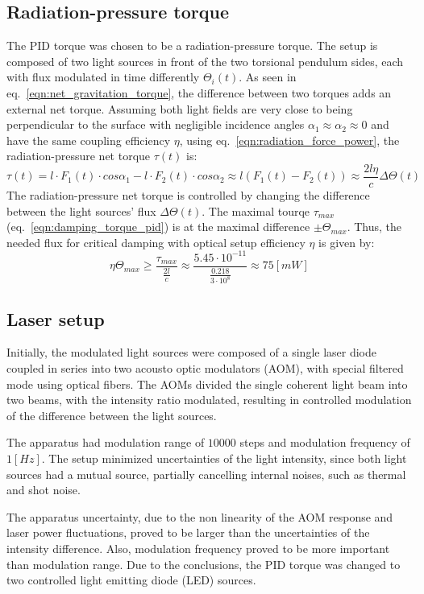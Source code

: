 \documentclass[\main/master.tex]{subfiles}
\begin{document}
\subsection{Radiation-pressure torque}
The PID torque was chosen to be a radiation-pressure torque. The setup is composed of two light sources in front of the two torsional pendulum sides, each with flux modulated in time differently $\Theta_i(t)$. As seen in eq.~\ref{eqn:net_gravitation_torque}, the difference between two torques adds an external net torque. Assuming both light fields are very close to being perpendicular to the surface with negligible incidence angles $\alpha_1\approx\alpha_2\approx 0$ and have the same coupling efficiency $\eta$, using eq.~\ref{eqn:radiation_force_power}, the radiation-pressure net torque $\tau(t)$ is:  
\begin{equation}
\tau(t) = l\cdot F_1(t) \cdot cos\alpha_1 - l\cdot F_2(t) \cdot cos\alpha_2\approx l(F_1(t) - F_2(t)) \approx \frac{2l\eta}{{c}} \Delta \Theta(t) \label{eqn:radiation torque}
\end{equation}
The radiation-pressure net torque is controlled by changing the difference between the light sources' flux $\Delta \Theta(t)$. The maximal tourqe $\tau_{max}$ (eq.~\ref{eqn:damping_torque_pid}) is at the maximal difference $\pm \Theta_{max}$. Thus, the needed flux for critical damping with optical setup efficiency $\eta$ is given by: 
\begin{equation}
\eta\Theta_{max} \geq \frac{\tau_{max}}{\frac{2 l}{c}}\approx \frac{5.45\cdot10^{-11}}{\frac{ 0.218}{3\cdot10^{8}}}\approx 75 [mW]
\label{eqn:max radiation torque}
\end{equation}

\subsection{Laser setup}
Initially, the modulated light sources were composed of a single laser diode coupled in series into two acousto optic modulators (AOM), with special filtered mode using optical fibers. The AOMs divided the single coherent light beam into two beams, with the intensity ratio modulated, resulting in controlled modulation of the difference between the light sources.
\par\noindent
The apparatus had modulation range of $10000$ steps and modulation frequency of $1 [Hz]$. The setup minimized uncertainties of the light intensity, since both light sources had a mutual source, partially cancelling internal noises, such as thermal and shot noise. 
\par\noindent
The apparatus uncertainty, due to the non linearity of the AOM response and laser power fluctuations, proved to be larger than the uncertainties of the intensity difference. Also, modulation frequency proved to be more important than modulation range. Due to the conclusions, the PID torque was changed to two controlled light emitting diode (LED) sources.
\end{document}
